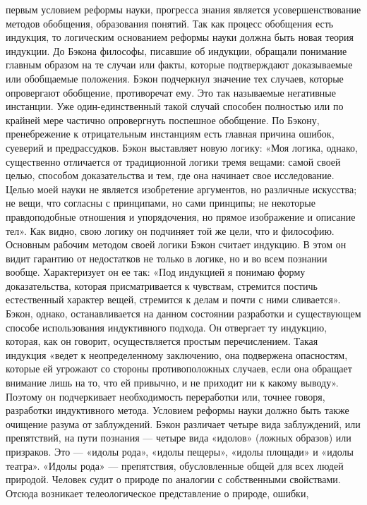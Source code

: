 \documentclass[12pt]{article}
\begin{document}
первым условием реформы науки, прогресса знания является усовершенствование методов обобщения, образования понятий.
Так как процесс обобщения есть индукция, то логическим основанием реформы науки должна 
быть новая теория индукции.
До Бэкона философы, писавшие об индукции, обращали понимание главным образом на те случаи или
факты, которые подтверждают доказываемые или обобщаемые положения. Бэкон подчеркнул значение тех
случаев,   которые   опровергают обобщение, противоречат ему. Это так называемые негативные инстанции.
Уже  один-единственный  такой  случай  способен  полностью  или  по  крайней  мере  частично  опровергнуть
поспешное обобщение. По Бэкону, пренебрежение к отрицательным инстанциям есть главная причина ошибок,
суеверий и предрассудков.
Бэкон выставляет новую логику: «Моя логика, однако, существенно отличается от традиционной логики тремя
вещами: самой своей целью, способом доказательства и тем, где она начинает свое исследование. Целью моей
науки не является изобретение аргументов, но различные искусства; не вещи, что согласны с принципами, но
сами принципы; не некоторые правдоподобные отношения и упорядочения, но прямое изображение и описание
тел». Как видно, свою логику он подчиняет той же цели, что и философию. Основным рабочим методом своей
логики Бэкон считает индукцию. В этом он видит гарантию от недостатков не только в логике, но и во всем
познании  вообще.  Характеризует  он  ее  так:  «Под  индукцией  я  понимаю  форму  доказательства,  которая
присматривается к чувствам, стремится постичь естественный характер вещей, стремится к делам и почти с
ними сливается».
Бэкон,  однако,  останавливается  на  данном  состоянии  разработки  и  существующем  способе  использования
индуктивного подхода. Он отвергает ту индукцию, которая, как он говорит, осуществляется простым
перечислением. Такая индукция «ведет к неопределенному заключению, она подвержена опасностям, которые
ей угрожают со стороны противоположных случаев, если она обращает внимание лишь на то, что ей привычно,
и не приходит ни к какому выводу». Поэтому он подчеркивает необходимость переработки или, точнее говоря,
разработки индуктивного метода.
Условием реформы науки должно быть также очищение разума от заблуждений. Бэкон различает четыре вида
заблуждений, или препятствий, на пути познания — четыре вида   «идолов»   (ложных  образов)   или
призраков. Это — «идолы рода», «идолы пещеры», «идолы площади» и «идолы театра».
«Идолы рода» — препятствия, обусловленные общей для всех людей природой. Человек судит о природе по
аналогии с собственными свойствами. Отсюда возникает телеологическое представление о природе, ошибки,
\end{document}
